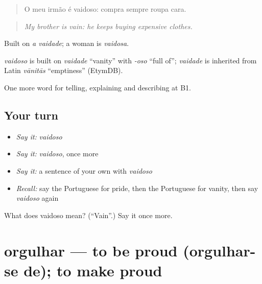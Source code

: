 \begin{quote}
O meu irmão é vaidoso: compra sempre roupa cara.
\end{quote}

\begin{quote}
\emph{My brother is vain: he keeps buying expensive clothes.}
\end{quote}

Built on \emph{a vaidade}; a woman is \emph{vaidosa}.

\begin{cousinweb}
\emph{vaidoso} is built on \emph{vaidade} \textquotedblleft{}vanity\textquotedblright{} with \emph{-oso} \textquotedblleft{}full of\textquotedblright{}; \emph{vaidade} is inherited from Latin \emph{vānitās} \textquotedblleft{}emptiness\textquotedblright{} (EtymDB).
\end{cousinweb}

\begin{grammarlens}[title={What you've built}]
One more word for telling, explaining and describing at B1.
\end{grammarlens}

\subsection*{Your turn}
\begin{itemize}
\raggedright
  \item \emph{Say it:} \emph{vaidoso}
  \item \emph{Say it:} \emph{vaidoso}, once more
  \item \emph{Say it:} a sentence of your own with \emph{vaidoso}
  \item \emph{Recall:} say the Portuguese for pride, then the Portuguese for vanity, then say \emph{vaidoso} again
\end{itemize}

\begin{tcolorbox}[breakable,colback=teal!4,colframe=teal!35!black,title={Before you move on}]
What does vaidoso mean? (\textquotedblleft{}Vain\textquotedblright{}.) Say it once more.
\end{tcolorbox}
\section[orgulhar]{orgulhar — to be proud (orgulhar-se de); to make proud}

\label{lesson:PT-C467-orgulhar}



